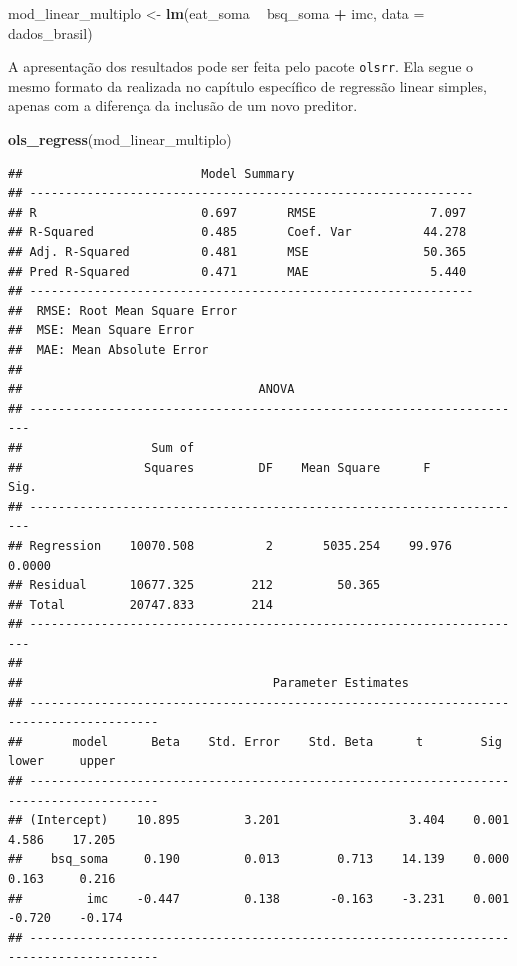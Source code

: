 \documentclass[
]{book}
\newenvironment{Shaded}{\begin{snugshade}}{\end{snugshade}}
\newcommand{\DataTypeTok}[1]{\textcolor[rgb]{0.13,0.29,0.53}{#1}}
\newcommand{\KeywordTok}[1]{\textcolor[rgb]{0.13,0.29,0.53}{\textbf{#1}}}
\newcommand{\NormalTok}[1]{#1}
\newcommand{\OperatorTok}[1]{\textcolor[rgb]{0.81,0.36,0.00}{\textbf{#1}}}
\newcommand{\StringTok}[1]{\textcolor[rgb]{0.31,0.60,0.02}{#1}}
\begin{document}
\begin{Shaded}
\begin{Highlighting}[]
\NormalTok{mod_linear_multiplo <-}\StringTok{ }\KeywordTok{lm}\NormalTok{(eat_soma }\OperatorTok{~}\StringTok{ }\NormalTok{bsq_soma }\OperatorTok{+}\StringTok{ }\NormalTok{imc, }\DataTypeTok{data =}\NormalTok{ dados_brasil)}
\end{Highlighting}
\end{Shaded}

A apresentação dos resultados pode ser feita pelo pacote \texttt{olsrr}. Ela segue o mesmo formato da realizada no capítulo específico de regressão linear simples, apenas com a diferença da inclusão de um novo preditor.

\begin{Shaded}
\begin{Highlighting}[]
\KeywordTok{ols_regress}\NormalTok{(mod_linear_multiplo)}
\end{Highlighting}
\end{Shaded}

\begin{verbatim}
##                         Model Summary                          
## --------------------------------------------------------------
## R                       0.697       RMSE                7.097 
## R-Squared               0.485       Coef. Var          44.278 
## Adj. R-Squared          0.481       MSE                50.365 
## Pred R-Squared          0.471       MAE                 5.440 
## --------------------------------------------------------------
##  RMSE: Root Mean Square Error 
##  MSE: Mean Square Error 
##  MAE: Mean Absolute Error 
## 
##                                 ANOVA                                  
## ----------------------------------------------------------------------
##                  Sum of                                               
##                 Squares         DF    Mean Square      F         Sig. 
## ----------------------------------------------------------------------
## Regression    10070.508          2       5035.254    99.976    0.0000 
## Residual      10677.325        212         50.365                     
## Total         20747.833        214                                    
## ----------------------------------------------------------------------
## 
##                                   Parameter Estimates                                    
## ----------------------------------------------------------------------------------------
##       model      Beta    Std. Error    Std. Beta      t        Sig      lower     upper 
## ----------------------------------------------------------------------------------------
## (Intercept)    10.895         3.201                  3.404    0.001     4.586    17.205 
##    bsq_soma     0.190         0.013        0.713    14.139    0.000     0.163     0.216 
##         imc    -0.447         0.138       -0.163    -3.231    0.001    -0.720    -0.174 
## ----------------------------------------------------------------------------------------
\end{verbatim}
\end{document}
